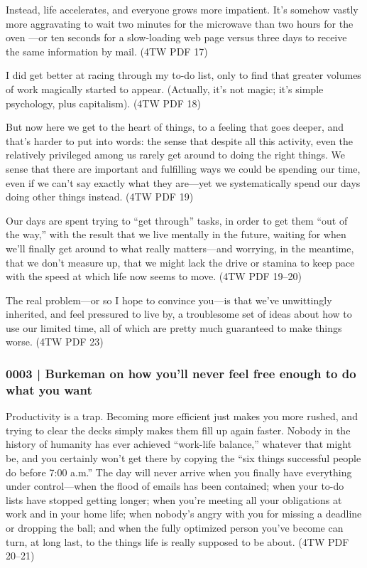 			Instead, life accelerates, and everyone grows more impatient. It's somehow vastly more aggravating to wait two minutes for the microwave than two hours for the oven ---or ten seconds for a slow-loading web page versus three days to receive the same information by mail. (4TW PDF 17)
			
			I did get better at racing through my to-do list, only to find that greater volumes of work magically started to appear. (Actually, it's not magic; it's simple psychology, plus capitalism). (4TW PDF 18)
			
			But now here we get to the heart of things, to a feeling that goes deeper, and that's harder to put into words: the sense that despite all this activity, even the relatively privileged among us rarely get around to doing the right things. We sense that there are important and fulfilling ways we could be spending our time, even if we can't say exactly what they are---yet we systematically spend our days doing other things instead. (4TW PDF 19) 

			Our days are spent trying to ``get through'' tasks, in order to get them ``out of the way,'' with the result that we live mentally in the future, waiting for when we'll finally get around to what really matters---and worrying, in the meantime, that we don't measure up, that we might lack the drive or stamina to keep pace with the speed at which life now seems to move. (4TW PDF 19--20) 
			
			The real problem---or so I hope to convince you---is that we've unwittingly inherited, and feel pressured to live by, a troublesome set of ideas about how to use our limited time, all of which are pretty much guaranteed to make things worse. (4TW PDF 23)
			
		\subsubsection{0003 | Burkeman on how you'll never feel free enough to do what you want}
			\label{GM-LIFE-TIME-0003}
			
			Productivity is a trap. Becoming more efficient just makes you more rushed, and trying to clear the decks simply makes them fill up again faster. Nobody in the history of humanity has ever achieved ``work-life balance,'' whatever that might be, and you certainly won't get there by copying the ``six things successful people do before 7:00 a.m.'' The day will never arrive when you finally have everything under control---when the flood of emails has been contained; when your to-do lists have stopped getting longer; when you're meeting all your obligations at work and in your home life; when nobody's angry with you for missing a deadline or dropping the ball; and when the fully optimized person you've become can turn, at long last, to the things life is really supposed to be about. (4TW PDF 20--21) 
			
